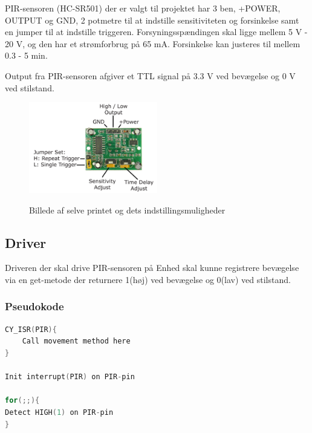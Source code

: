 PIR-sensoren (HC-SR501) der er valgt til projektet har 3 ben, +POWER, OUTPUT og GND, 2 potmetre til at indstille sensitiviteten og forsinkelse samt en jumper til at indstille triggeren. Forsyningsspændingen skal ligge mellem 5 V - 20 V, og den har et strømforbrug på 65 mA. Forsinkelse kan justeres til mellem 0.3 - 5 min.

Output fra PIR-sensoren afgiver et TTL signal på 3.3 V ved bevægelse og 0 V ved stilstand.

\begin{figure}[H] \centering
{\includegraphics[width=0.5\textwidth]{filer/design/Billeder/pir_overview}}
\caption{Billede af selve printet og dets indstillingsmuligheder}
\label{lab:pir_overview}
\raggedright
\end{figure}

\subsection*{Driver}

Driveren der skal drive PIR-sensoren på Enhed skal kunne registrere bevægelse via en get-metode der returnere 1(høj) ved bevægelse og 0(lav) ved stilstand.

\subsubsection*{Pseudokode}

\begin{lstlisting}[language=C]
CY_ISR(PIR){
    Call movement method here
} 

Init interrupt(PIR) on PIR-pin

for(;;){
Detect HIGH(1) on PIR-pin
}
\end{lstlisting}